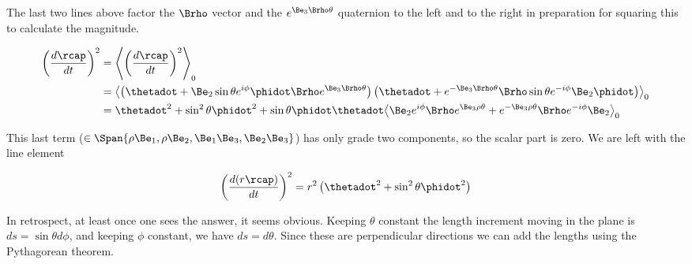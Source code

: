 The last two lines above factor the $\Brho$ vector and the $e^{\Be_3 \Brho \theta}$ quaternion to the left and to the right in preparation for squaring this to calculate the magnitude.

\begin{align*}
\left( \frac{d\rcap}{dt} \right)^2
&=
\gpgradezero{ \left( \frac{d\rcap}{dt} \right)^2 } \\
&=
\gpgradezero{ 
\left( \thetadot + \Be_2 \sin\theta e^{i\phi} \phidot \Brho e^{\Be_3 \Brho \theta} \right) 
\left(\thetadot + e^{-\Be_3 \Brho \theta} \Brho \sin\theta e^{-i\phi} \Be_2 \phidot\right) } \\
&=
\thetadot^2 + \sin^2\theta \phidot^2
+ \sin\theta \phidot \thetadot
\gpgradezero{ 
\Be_2 e^{i\phi} \Brho e^{\Be_3 \rho \theta}
+e^{-\Be_3 \rho \theta} \Brho e^{-i\phi} \Be_2
} \\
\end{align*}

This last term ($\in \Span \{\rho\Be_1, \rho\Be_2, \Be_1\Be_3, \Be_2\Be_3\}$) has only grade two components, so the scalar part is zero.  We are left with the line element 

\begin{align}\label{eqn:sphericalPolarUnit:yoo4}
\left(\frac{d (r\rcap)}{dt}\right)^2 = r^2 \left( \thetadot^2 + \sin^2\theta \phidot^2 \right)
\end{align}

In retrospect, at least once one sees the answer, it seems obvious.  Keeping $\theta$ constant the length increment moving in the plane is $ds = \sin\theta d\phi$, and keeping $\phi$ constant, we have $ds = d\theta$.  Since these are perpendicular directions we can add the lengths using the Pythagorean theorem.

\EndArticle
